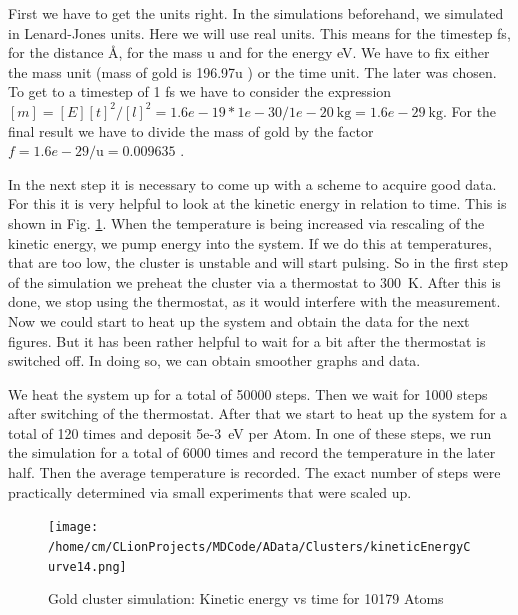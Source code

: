 \par 
First we have to get the units right. In the simulations beforehand, we simulated in Lenard-Jones units. 
Here we will use real units. 
This means for the timestep fs, for the distance \r{A}, for the mass u and for the energy eV. 
We have to fix either the mass unit (mass of gold is 196.97u \cite{Kurzweil2015}) or the time unit. 
The later was chosen. To get to a timestep of 1 fs we have to consider the expression $ [m] = [E][t]^2/[l]^2 = 1.6e-19 * 1e-30/1e-20~\mathrm{kg} = 1.6e-29~\mathrm{kg} $. For the final result we have to divide the mass of gold by the factor $ f = 1.6e-29/\mathrm{u} = 0.009635 $
\cite{molDymCourse}.

In the next step it is necessary to come up with a scheme to acquire good data.
For this it is very helpful to look at the kinetic energy in relation to time. 
This is shown in Fig. \ref{GoldClusterSimulationKinVsTime}. 
When the temperature is being increased via rescaling of the kinetic energy, we pump energy into the system. 
If we do this at temperatures, that are too low, the cluster is unstable and will start pulsing. 
So in the first step of the simulation we preheat the cluster via a thermostat to 300~K. 
After this is done, we stop using the thermostat, as it would interfere with the measurement. 
Now we could start to heat up the system and obtain the data for the next figures. But it has been rather helpful to wait for a bit after the thermostat is switched off. In doing so, we can obtain smoother graphs and data. 
\par
We heat the system up for a total of 50000 steps. Then we wait for 1000 steps after switching of the thermostat. 
After that we start to heat up the system for a total of 120 times and deposit 5e-3~eV per Atom. 
In one of these steps, we run the simulation for a total of 6000 times and record the temperature in the later half. 
Then the average temperature is recorded. 
The exact number of steps were practically determined via small experiments that were scaled up. 
\begin{figure}
	\begin{center} 
		\texttt{[image: /home/cm/CLionProjects/MDCode/AData/Clusters/kineticEnergyCurve14.png]} 
	\end{center} 
	\caption[Gold cluster simulation: Kinetic Energy vs Time]{Gold cluster simulation: Kinetic energy vs time for 10179 Atoms} 
	\label{GoldClusterSimulationKinVsTime} 
\end{figure} 


